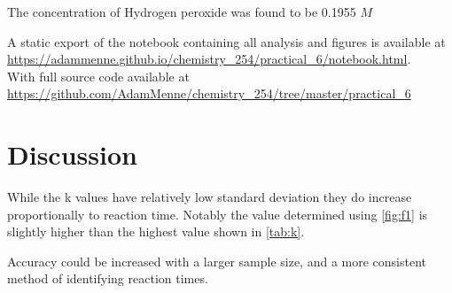 \documentclass[a4paper, british]{article}
\begin{document}
The concentration of Hydrogen peroxide was found to be 0.1955 \(M\)

A static export of the notebook containing all analysis and figures is available at \url{https://adammenne.github.io/chemistry_254/practical_6/notebook.html}.\\ With full source code available at \url{https://github.com/AdamMenne/chemistry_254/tree/master/practical_6}

\section{Discussion}

While the k values have relatively low standard deviation they do increase proportionally to reaction time. Notably the value determined using \cref{fig:f1} is slightly higher than the highest value shown in \cref{tab:k}.

Accuracy could be increased with a larger sample size, and a more consistent method of identifying reaction times.

\newpage
\end{document}
